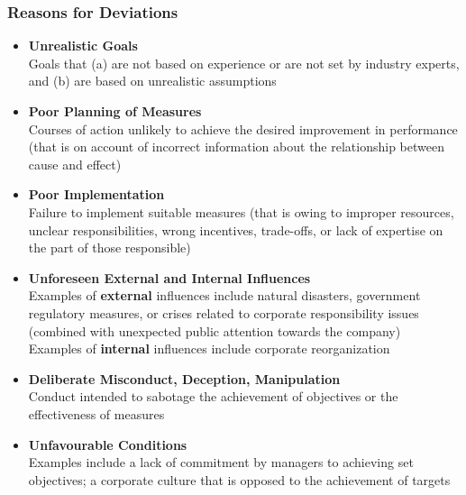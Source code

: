 \documentclass[11pt]{article}
\theoremstyle{definition}
\begin{document}
\subsubsection{Reasons for Deviations}
\begin{itemize}
	\item \textbf{Unrealistic Goals}\\ Goals that (a) are not based on experience or are not set by industry experts, and (b) are based on unrealistic assumptions
	\item \textbf{Poor Planning of Measures}\\ Courses of action unlikely to achieve the desired improvement in performance (that is on account of incorrect information about the relationship between cause and effect)
	\item \textbf{Poor Implementation}\\ Failure to implement suitable measures (that is owing to improper resources, unclear responsibilities, wrong incentives, trade-offs, or lack of expertise on the part of those responsible)
	\item \textbf{Unforeseen External and Internal Influences}\\ Examples of \textbf{external} influences include natural disasters, government regulatory measures, or crises related to corporate responsibility issues (combined with unexpected public attention towards the company)\\ Examples of \textbf{internal} influences include corporate reorganization
	\item \textbf{Deliberate Misconduct, Deception, Manipulation}\\ Conduct intended to sabotage the achievement of objectives or the effectiveness of measures
	\item \textbf{Unfavourable Conditions}\\ Examples include a lack of commitment by managers to achieving set objectives; a corporate culture that is opposed to the achievement of targets
\end{itemize}

\clearpage
\end{document}
